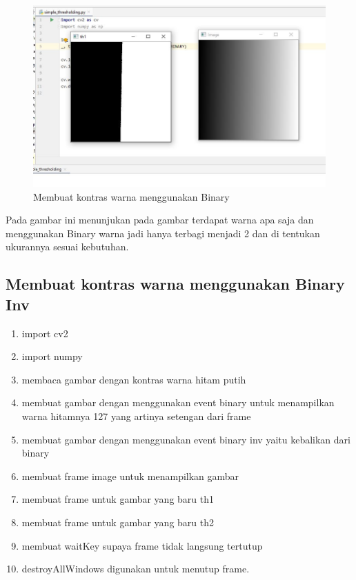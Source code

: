 \newpage
\begin{figure}[ht]
\centering
\includegraphics[scale=0.5]{figures/2,38.jpg}
\caption{Membuat kontras warna menggunakan Binary}
\label{contoh}
\end{figure}
Pada gambar ini menunjukan pada gambar terdapat warna apa saja dan menggunakan Binary warna jadi hanya terbagi menjadi 2 dan di tentukan ukurannya sesuai kebutuhan.




\newpage
\subsection{Membuat kontras warna menggunakan Binary Inv}

\begin{enumerate}
	\item import cv2
	\item import numpy
	\item membaca gambar dengan kontras warna hitam putih
	\item membuat gambar dengan menggunakan event binary untuk menampilkan warna hitamnya 127 yang artinya setengan dari frame
	\item membuat gambar dengan menggunakan event binary inv yaitu kebalikan dari binary
	\item membuat frame image untuk menampilkan gambar
	\item membuat frame untuk gambar yang baru th1
	\item membuat frame untuk gambar yang baru th2
	\item membuat waitKey supaya frame tidak langsung tertutup
	\item destroyAllWindows digunakan untuk menutup frame.
\end{enumerate}

